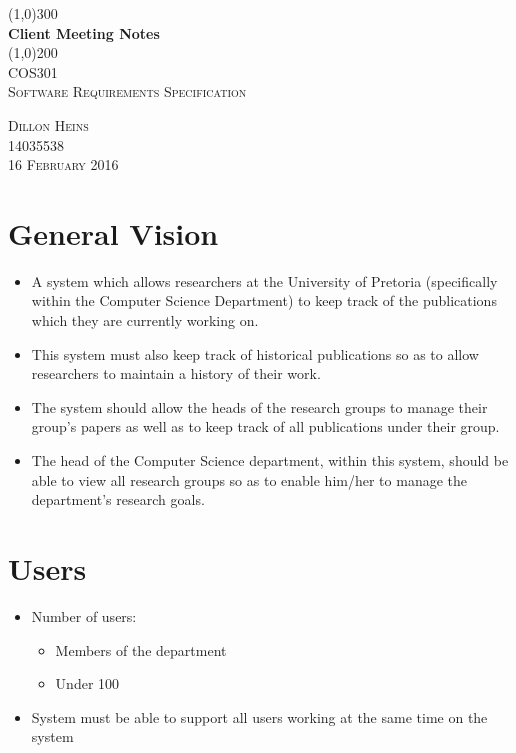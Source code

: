 \documentclass{article}
\begin{document}
\begin{titlepage}
	\begin{center}
		\line(1,0){300}\\
		[6mm]
		\huge{\bfseries Client Meeting Notes}\\
		[2mm]
		\line(1,0){200}\\
		[15mm]
		\textsc{\large COS301}\\
		[7.5mm]
		\textsc{\large Software Requirements Specification}\\
		[10cm]
	\end{center}
	
	\begin{flushright}
		\textsc{\large Dillon Heins\\
		14035538\\
		16 February 2016\\}
	\end{flushright}
\end{titlepage}

\tableofcontents
\thispagestyle{empty}
\cleardoublepage
%

\setcounter{page}{1}
%

\section{General Vision}\label{sec:vision}
	\begin{itemize}
		\item A system which allows researchers at the University of Pretoria (specifically within the Computer Science Department) to keep track of the publications which they are currently working on.
		\item This system must also keep track of historical publications so as to allow researchers to maintain a history of their work.
		\item The system should allow the heads of the research groups to manage their group's papers as well as to keep track of all publications under their group.
		\item The head of the Computer Science department, within this system, should be able to view all research groups so as to enable him/her to manage the department's research goals.
	\end{itemize}

\section{Users}\label{sec:users}
	\begin{itemize}
		\item Number of users:
		\begin{itemize}
			\item Members of the department
			\item Under 100
		\end{itemize}
		\item System must be able to support all users working at the same time on the system
	\end{itemize}
	
\end{document}
